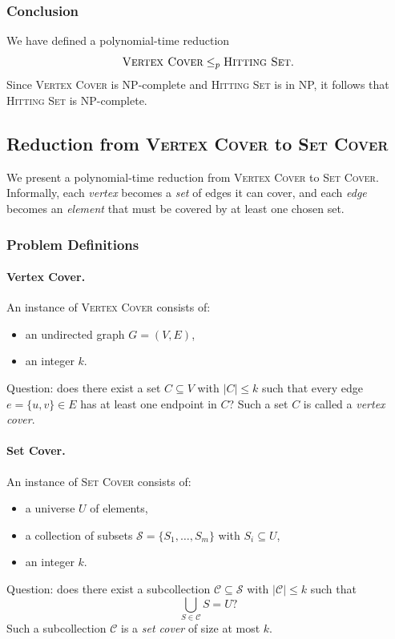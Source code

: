 \documentclass[9pt]{extarticle}
\begin{document}
\subsubsection*{Conclusion}

We have defined a polynomial-time reduction
\[
    \textsc{Vertex Cover} \le_p \textsc{Hitting Set}.
\]
Since \textsc{Vertex Cover} is NP-complete and \textsc{Hitting Set} is in NP,
it follows that \textsc{Hitting Set} is NP-complete.

\subsection{Reduction from \textsc{Vertex Cover} to \textsc{Set Cover}}

We present a polynomial-time reduction from \textsc{Vertex Cover} to
\textsc{Set Cover}.  Informally, each \emph{vertex} becomes a \emph{set} of
edges it can cover, and each \emph{edge} becomes an \emph{element} that must be
covered by at least one chosen set.

\subsubsection*{Problem Definitions}

\paragraph{Vertex Cover.}
An instance of \textsc{Vertex Cover} consists of:
\begin{itemize}
    \item an undirected graph $G = (V,E)$,
    \item an integer $k$.
\end{itemize}
Question: does there exist a set $C \subseteq V$ with $|C| \le k$ such that
every edge $e = \{u,v\} \in E$ has at least one endpoint in $C$?
Such a set $C$ is called a \emph{vertex cover}.

\paragraph{Set Cover.}
An instance of \textsc{Set Cover} consists of:
\begin{itemize}
    \item a universe $U$ of elements,
    \item a collection of subsets $\mathcal{S} = \{S_1,\dots,S_m\}$ with
          $S_i \subseteq U$,
    \item an integer $k$.
\end{itemize}
Question: does there exist a subcollection
$\mathcal{C} \subseteq \mathcal{S}$ with $|\mathcal{C}| \le k$ such that
\[
    \bigcup_{S \in \mathcal{C}} S = U?
\]
Such a subcollection $\mathcal{C}$ is a \emph{set cover} of size at most $k$.
\end{document}
